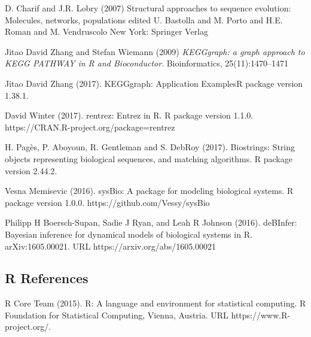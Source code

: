 \documentclass[preprint, 8pt]{elsarticle}
\theoremstyle{definition}
\begin{document}
\begin{thebibliography}{00}
D. Charif and J.R. Lobry (2007)
\newblock Structural approaches to sequence evolution: Molecules, networks, populations edited U. Bastolla and M. Porto and H.E. Roman and M. Vendruscolo 
\newblock New York: Springer Verlag

 Jitao David Zhang and Stefan Wiemann (2009)
\newblock \emph{KEGGgraph: a graph approach to KEGG PATHWAY in R and Bioconductor}.
\newblock Bioinformatics, 25(11):1470--1471

 Jitao David Zhang (2017). 
\newblock KEGGgraph: Application ExamplesR
\newblock package version 1.38.1.

 David Winter (2017). 
\newblock rentrez: Entrez in R. 
\newblock R package version 1.1.0. https://CRAN.R-project.org/package=rentrez

 H. Pagès, P. Aboyoun, R. Gentleman and S. DebRoy (2017).
\newblock Biostrings: String objects representing biological sequences, and matching algorithms. 
\newblock R package version 2.44.2.

 Vesna Memisevic (2016). 
\newblock sysBio: A package for modeling biological systems. 
\newblock R package version 1.0.0. https://github.com/Vessy/sysBio

 Philipp H Boersch-Supan, Sadie J Ryan, and Leah R Johnson (2016). 
\newblock deBInfer: Bayesian inference for dynamical models of biological systems in R. 
\newblock arXiv:1605.00021. URL https://arxiv.org/abs/1605.00021


\subsection{R References}

R Core Team (2015). 
\newblock R: A language and environment for statistical computing. R Foundation for Statistical Computing, Vienna, Austria.
\newblock URL https://www.R-project.org/.

\end{thebibliography}
\end{document}
